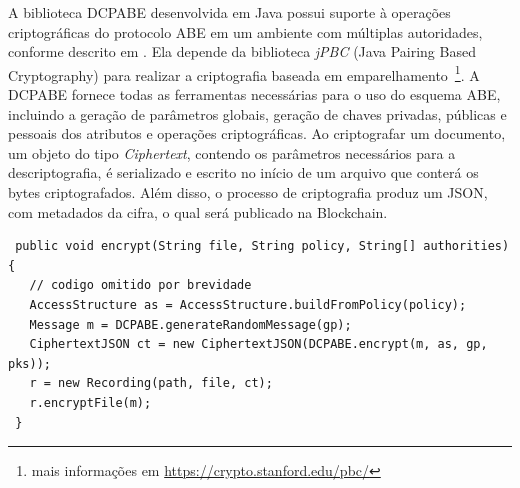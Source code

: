 \documentclass[a4paper,11pt]{article}
\begin{document}
A biblioteca DCPABE desenvolvida em Java possui suporte à operações criptográficas do protocolo ABE em um ambiente com múltiplas autoridades, conforme descrito em \cite{Lewko2011}. Ela depende da biblioteca \emph{jPBC} (Java Pairing Based Cryptography) %
para realizar a criptografia baseada em emparelhamento~\footnote{mais informações em \href{https://crypto.stanford.edu/pbc/}{https://crypto.stanford.edu/pbc/}}. %
A DCPABE fornece todas as ferramentas necessárias para o uso do esquema ABE, incluindo a geração de parâmetros globais, geração de chaves privadas, públicas e pessoais dos atributos e operações criptográficas. %
Ao criptografar um documento, um objeto do tipo \emph{Ciphertext}, contendo os parâmetros necessários para a descriptografia, é serializado e escrito no início de um arquivo que conterá os bytes criptografados. {\color{blue}Além disso, o processo de criptografia produz um JSON, com metadados da cifra, o qual será publicado na Blockchain}.



\begin{lstlisting}
 public void encrypt(String file, String policy, String[] authorities) {
   // codigo omitido por brevidade
   AccessStructure as = AccessStructure.buildFromPolicy(policy);
   Message m = DCPABE.generateRandomMessage(gp);
   CiphertextJSON ct = new CiphertextJSON(DCPABE.encrypt(m, as, gp, pks));
   r = new Recording(path, file, ct);
   r.encryptFile(m);
 }
\end{lstlisting}
\end{document}
